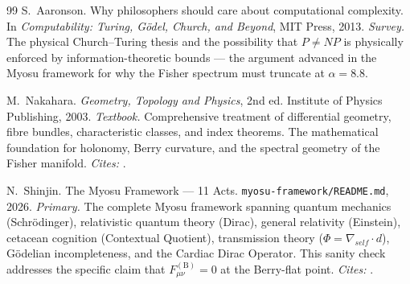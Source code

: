\documentclass[12pt,a4paper]{article}
\begin{document}
\begin{thebibliography}{99}
S.~Aaronson.
\newblock Why philosophers should care about computational complexity.
\newblock In \emph{Computability: Turing, G\"odel, Church, and Beyond}, MIT Press, 2013.
\newblock \textit{Survey.} The physical Church--Turing thesis and the possibility that
$P \neq NP$ is physically enforced by information-theoretic bounds --- the argument
advanced in the Myosu framework for why the Fisher spectrum must truncate at $\alpha=8.8$.

M.~Nakahara.
\newblock \emph{Geometry, Topology and Physics}, 2nd ed.
\newblock Institute of Physics Publishing, 2003.
\newblock \textit{Textbook.} Comprehensive treatment of differential geometry, fibre bundles,
characteristic classes, and index theorems. The mathematical foundation for holonomy,
Berry curvature, and the spectral geometry of the Fisher manifold.
\textit{Cites:} \cite{berry1984,simon1983,aharonov1959,peshkin1989}.

N.~Shinjin.
\newblock The Myosu Framework --- 11 Acts.
\newblock \texttt{myosu-framework/README.md}, 2026.
\newblock \textit{Primary.} The complete Myosu framework spanning quantum mechanics
(Schr\"odinger), relativistic quantum theory (Dirac), general relativity (Einstein),
cetacean cognition (Contextual Quotient), transmission theory ($\Phi = \nabla_{\!self}\!\cdot d$),
G\"odelian incompleteness, and the Cardiac Dirac Operator. This sanity check addresses
the specific claim that $F_{\mu\nu}^{(\mathrm{B})}=0$ at the Berry-flat point.
\textit{Cites:} \cite{berry1984,aharonov1959,amari2000,watanabe2009,breitenlohner1982,
maldacena1999,witten1998,aaronson2013,nakahara2003}.

\end{thebibliography}
\end{document}
